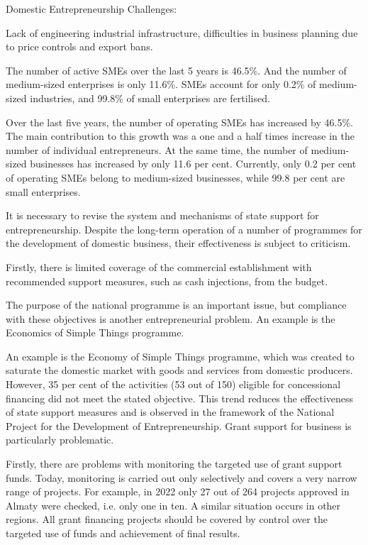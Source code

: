 Domestic Entrepreneurship Challenges:

Lack of engineering industrial infrastructure, difficulties in business
planning due to price controls and export bans.

The number of active SMEs over the last 5 years is 46.5\%. And the
number of medium-sized enterprises is only 11.6\%. SMEs account for only
0.2\% of medium-sized industries, and 99.8\% of small enterprises are
fertilised.

Over the last five years, the number of operating SMEs has increased by
46.5\%. The main contribution to this growth was a one and a half times
increase in the number of individual entrepreneurs. At the same time,
the number of medium-sized businesses has increased by only 11.6 per
cent. Currently, only 0.2 per cent of operating SMEs belong to
medium-sized businesses, while 99.8 per cent are small enterprises.

It is necessary to revise the system and mechanisms of state support for
entrepreneurship. Despite the long-term operation of a number of
programmes for the development of domestic business, their effectiveness
is subject to criticism.

Firstly, there is limited coverage of the commercial establishment with
recommended support measures, such as cash injections, from the budget.

The purpose of the national programme is an important issue, but
compliance with these objectives is another entrepreneurial problem. An
example is the Economics of Simple Things programme.

An example is the Economy of Simple Things programme, which was created
to saturate the domestic market with goods and services from domestic
producers. However, 35 per cent of the activities (53 out of 150)
eligible for concessional financing did not meet the stated objective.
This trend reduces the effectiveness of state support measures and is
observed in the framework of the National Project for the Development of
Entrepreneurship. Grant support for business is particularly
problematic.

Firstly, there are problems with monitoring the targeted use of grant
support funds. Today, monitoring is carried out only selectively and
covers a very narrow range of projects. For example, in 2022 only 27 out
of 264 projects approved in Almaty were checked, i.e. only one in ten. A
similar situation occurs in other regions. All grant financing projects
should be covered by control over the targeted use of funds and
achievement of final results.

